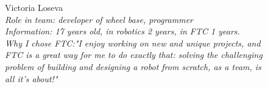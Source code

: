 \begin{figure}[H]	
	\begin{minipage}{0.47\linewidth}
	\end{minipage}
	\hfill
	\begin{minipage}{0.47\linewidth}
		Victoria Loseva\\
		\emph{Role in team: developer of wheel base, programmer\\ }
		\emph{Information: 17 years old, in robotics 2 years, in FTC 1 years. \\} 
		\emph{Why I chose FTC:"I enjoy working on new and unique projects, and FTC is a great way for me to do exactly that: solving the challenging problem of building and designing a robot from scratch, as a team, is all it's about!"}			
	\end{minipage}
\end{figure}
\fillpage


